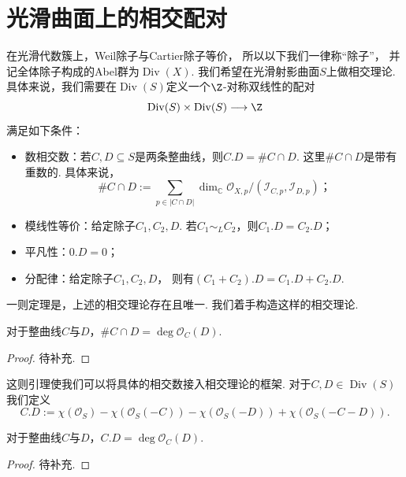 \section{光滑曲面上的相交配对}
在光滑代数簇上，Weil除子与Cartier除子等价，
所以以下我们一律称“除子”，
并记全体除子构成的Abel群为$\operatorname{Div}(X)$.
我们希望在光滑射影曲面$S$上做相交理论.
 具体来说，我们需要在$\operatorname{Div}(S)$定义一个$\Z$-对称双线性的配对
\[\operatorname{Div}(S) \times \operatorname{Div}(S) \longrightarrow \Z\]
满足如下条件：
\begin{itemize}
    \item[(1)] 数相交数：若$C,D \subseteq S$是两条整曲线，则$C.D = \# C \cap D$.
    这里$\# C \cap D$是带有重数的. 具体来说，
    \[\# C \cap D := \sum_{p \in |C \cap D|}\dim_{\mathbb{C}}\mathscr{O}_{X,p}
    /(\mathscr{I}_{C,p},\mathscr{I}_{D,p})；\]

    \item[(2)] 模线性等价：给定除子$C_{1},C_{2},D$.
    若$C_{1} \sim_{L} C_{2}$，则$C_{1}.D = C_{2}.D$；

    \item[(3)] 平凡性：$0.D = 0$；

    \item[(4)] 分配律：给定除子$C_{1},C_{2},D$，
    则有$(C_{1} + C_{2}).D = C_{1}.D + C_{2}.D$.
\end{itemize}

一则定理是，上述的相交理论存在且唯一. 我们着手构造这样的相交理论.
\begin{lemma}
   对于整曲线$C$与$D$，$\# C \cap D = \deg \mathscr{O}_{C}(D)$.  
\end{lemma}
\begin{proof}
    待补充.
\end{proof}

这则引理使我们可以将具体的相交数接入相交理论的框架. 
对于$C,D \in \operatorname{Div}(S)$我们定义
\[C.D := \chi(\mathscr{O}_{S}) - \chi(\mathscr{O}_{S}(-C)) 
- \chi(\mathscr{O}_{S}(-D)) + \chi(\mathscr{O}_{S}(-C - D)).\]

\begin{lemma}
    对于整曲线$C$与$D$，$C.D = \deg \mathscr{O}_{C}(D)$.
\end{lemma}
\begin{proof}
    待补充.
\end{proof}

